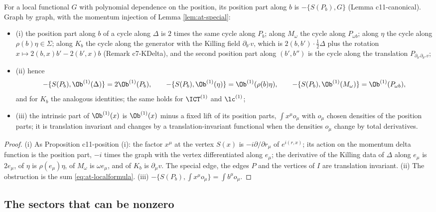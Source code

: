 \begin{proposition}
\label{prop:at-pos}
For a local functional $G$ with polynomial dependence on the position, its position part along $b$ is $-\{S(P_b),G\}$ (Lemma c11-canonical). Graph by graph, with the momentum injection of Lemma \ref{lem:at-special}:
\begin{itemize}
\item (i) the position part along $b$ of a cycle along $\Delta$ is $2$ times the same cycle along $P_b$; along $M_\omega$ the cycle along $P_{\omega b}$; along $\eta$ the cycle along $\rho(b)\eta\in\Sigma$; along $K_b$ the cycle along the generator with the Killing field $\partial_{b'}v$, which is $2(b,b')\cdot\tfrac12\Delta$ plus the rotation $x\mapsto2(b,x)b'-2(b',x)b$ (Remark c7-KDelta), and the second position part along $(b',b'')$ is the cycle along the translation $P_{\partial_{b'}\partial_{b''}v}$;
\item (ii) hence
\[
-\{S(P_b),\Ob^{(1)}(\Delta)\}=2\Ob^{(1)}(P_b),\qquad -\{S(P_b),\Ob^{(1)}(\eta)\}=\Ob^{(1)}(\rho(b)\eta),\qquad -\{S(P_b),\Ob^{(1)}(M_\omega)\}=\Ob^{(1)}(P_{\omega b}),
\]
and for $K_b$ the analogous identities; the same holds for $\ICT^{(1)}$ and $\lc^{(1)}$;
\item (iii) the intrinsic part of $\Ob^{(1)}(x)$ is $\Ob^{(1)}(x)$ minus a fixed lift of its position parts, $\int x^\mu o_\mu$ with $o_\mu$ chosen densities of the position parts; it is translation invariant and changes by a translation-invariant functional when the densities $o_\mu$ change by total derivatives.
\end{itemize}
\end{proposition}

\begin{proof}
(i) As Proposition c11-position (i): the factor $x^\mu$ at the vertex $S(x)$ is $-i\partial/\partial r_\mu$ of $e^{i(r,x)}$; its action on the momentum delta function is the position part, $-i$ times the graph with the vertex differentiated along $e_\mu$; the derivative of the Killing data of $\Delta$ along $e_\mu$ is $2e_\mu$, of $\eta$ is $\rho(e_\mu)\eta$, of $M_\omega$ is $\omega e_\mu$, and of $K_b$ is $\partial_\mu v$. The special edge, the edges $P$ and the vertices of $I$ are translation invariant. (ii) The obstruction is the sum \eqref{eq:at-localformula}. (iii) $-\{S(P_b),\int x^\mu o_\mu\}=\int b^\mu o_\mu$.
\end{proof}

\subsection{The sectors that can be nonzero}

